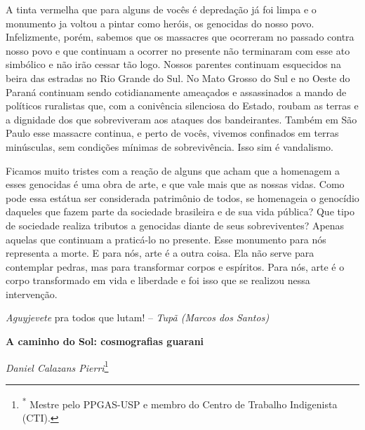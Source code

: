 A tinta vermelha que para alguns de vocês é depredação já foi limpa e o
monumento ja voltou a pintar como heróis, os genocidas do nosso povo.
Infelizmente, porém, sabemos que os massacres que ocorreram no passado
contra nosso povo e que continuam a ocorrer no presente não terminaram
com esse ato simbólico e não irão cessar tão logo. Nossos parentes
continuam esquecidos na beira das estradas no Rio Grande do Sul. No Mato
Grosso do Sul e no Oeste do Paraná continuam sendo cotidianamente
ameaçados e assassinados a mando de políticos ruralistas que, com a
conivência silenciosa do Estado, roubam as terras e a dignidade dos que
sobreviveram aos ataques dos bandeirantes. Também em São Paulo esse
massacre continua, e perto de vocês, vivemos confinados em terras
minúsculas, sem condições mínimas de sobrevivência. Isso sim é
vandalismo.

Ficamos muito tristes com a reação de alguns que acham que a homenagem a
esses genocidas é uma obra de arte, e que vale mais que as nossas vidas.
Como pode essa estátua ser considerada patrimônio de todos, se
homenageia o genocídio daqueles que fazem parte da sociedade brasileira
e de sua vida pública? Que tipo de sociedade realiza tributos a
genocidas diante de seus sobreviventes? Apenas aquelas que continuam a
praticá-lo no presente. Esse monumento para nós representa a morte. E
para nós, arte é a outra coisa. Ela não serve para contemplar pedras,
mas para transformar corpos e espíritos. Para nós, arte é o corpo
transformado em vida e liberdade e foi isso que se realizou nessa
intervenção.

\emph{Aguyjevete} pra todos que lutam! -- \emph{Tupã (Marcos dos
Santos)}

\textbf{A caminho do Sol: cosmografias guarani}

\emph{Daniel Calazans Pierri}\footnote{\textsuperscript{*} Mestre pelo
  PPGAS-USP e membro do Centro de Trabalho Indigenista (CTI).}


